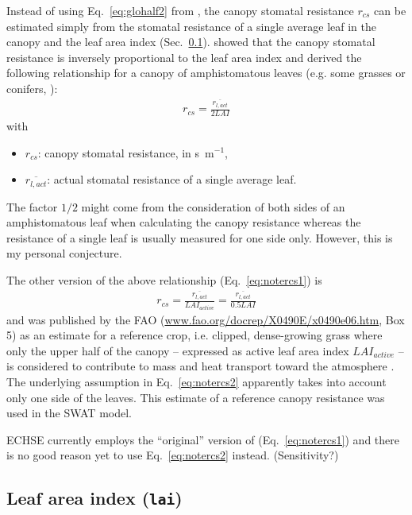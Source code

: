 \documentclass{scrreprt}
\newenvironment{denseitem}{
  \begin{itemize}
    \setlength{\itemsep}{0pt}
    \setlength{\parskip}{0pt}
    \setlength{\parsep}{0pt}
}{
  \end{itemize}
}
\begin{document}
Instead of using Eq.~\eqref{eq:glohalf2} from \citet{saugier91}, the canopy stomatal resistance $r_{cs}$ can be estimated simply from the stomatal resistance of a single average leaf in the canopy and the leaf area index (Sec.~\ref{ssec:parest_veg_lai}).
\citet{shuttleworth76} showed that the canopy stomatal resistance is inversely proportional to the leaf area index and derived the following relationship for a canopy of amphistomatous leaves (e.g. some grasses or conifers, \citealt{shuttleworth85}):
\begin{align} \label{eq:notercs1}
  r_{cs} = \frac{\overline{r_{l,act}}}{2 LAI}
\end{align}
%
with
\begin{denseitem}
  \item[] $r_{cs}$: canopy stomatal resistance, in s~m$^{-1}$,
  \item[] $\overline{r_{l,act}}$: actual stomatal resistance of a single average leaf.
\end{denseitem}
%
The factor $1/2$ might come from the consideration of both sides of an amphistomatous leaf when calculating the canopy resistance whereas the resistance of a single leaf is usually measured for one side only.
However, this is my personal conjecture.

The other version of the above relationship (Eq.~\ref{eq:notercs1}) is
\begin{align} \label{eq:notercs2}
  r_{cs} = \frac{\overline{r_{l,act}}}{LAI_{active}} = \frac{\overline{r_{l,act}}}{0.5 LAI}
\end{align}
%
and was published by the FAO (\url{www.fao.org/docrep/X0490E/x0490e06.htm}, Box 5) as an estimate for a reference crop, i.e. clipped, dense-growing grass where only the upper half of the canopy -- expressed as active leaf area index $LAI_{active}$ -- is considered to contribute to mass and heat transport toward the atmosphere \citep{fao98}.
The underlying assumption in Eq.~\eqref{eq:notercs2} apparently takes into account only one side of the leaves.
This estimate of a reference canopy resistance was used in the SWAT model.

ECHSE currently employs the ``original'' version of \citet{shuttleworth85} (Eq.~\ref{eq:notercs1}) and there is no good reason yet to use Eq.~\eqref{eq:notercs2} instead.
(Sensitivity?)

\subsection{Leaf area index (\texttt{lai})} \label{ssec:parest_veg_lai}
\end{document}
